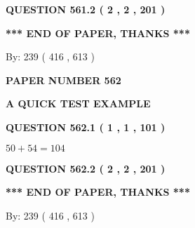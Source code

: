 \documentclass[12pt]{article}
\begin{document}
 
  
\vspace{0.2in}
  
{\textbf{\Large{QUESTION
561.2 
 ( 2 , 2 , 201 )
}}}
  
  
   
   
 \vspace{0.2in}
 
   
   
   
   
\vspace{1.0in} 
{\textbf{\large{ *** END OF PAPER, THANKS *** }}} 
   
   
\hspace{1.0in} By: 
 239 ( 416 ,  613 )
   
   
   
   
\newpage 
\setcounter{page}{ 
   562001 } 
   
   
   
   
 {\textbf{ \Large{ PAPER NUMBER  562  }}}
   
   
\vspace{0.2in}
   
   
   
   
   
   
 \vspace{0.2in}
{\LARGE {\textbf{ A QUICK TEST EXAMPLE}}}
   
   
  
\vspace{0.2in}
  
{\textbf{\Large{QUESTION
562.1 
 ( 1 , 1 , 101 )
}}}
  
  
 
 

$ %
50 +  %
54=   %
104$
 
 
  
\vspace{0.2in}
  
{\textbf{\Large{QUESTION
562.2 
 ( 2 , 2 , 201 )
}}}
  
  
   
   
 \vspace{0.2in}
 
   
   
   
   
\vspace{1.0in} 
{\textbf{\large{ *** END OF PAPER, THANKS *** }}} 
   
   
\hspace{1.0in} By: 
 239 ( 416 ,  613 )
   
\end{document}
